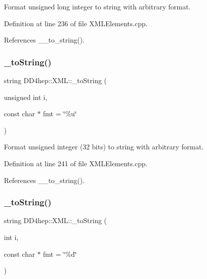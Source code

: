 Format unsigned long integer to string with arbitrary format. 



Definition at line 236 of file X\+M\+L\+Elements.\+cpp.



References \+\_\+\+\_\+to\+\_\+string().

\hypertarget{group___d_d4_h_e_p___x_m_l_ga394251d8f037bcee0db303753aefc97b}{}\label{group___d_d4_h_e_p___x_m_l_ga394251d8f037bcee0db303753aefc97b} 
\subsubsection{\texorpdfstring{\+\_\+to\+String()}{\_toString()}\hspace{0.1cm}{\footnotesize\ttfamily [6/12]}}
{\footnotesize\ttfamily string D\+D4hep\+::\+X\+M\+L\+::\+\_\+to\+String (\begin{DoxyParamCaption}\item[{unsigned int}]{i,  }\item[{const char $\ast$}]{fmt = {\ttfamily \char`\"{}\%u\char`\"{}} }\end{DoxyParamCaption})}



Format unsigned integer (32 bits) to string with arbitrary format. 



Definition at line 241 of file X\+M\+L\+Elements.\+cpp.



References \+\_\+\+\_\+to\+\_\+string().

\hypertarget{group___d_d4_h_e_p___x_m_l_ga3db5e3893d601405e4881f4e59aab45a}{}\label{group___d_d4_h_e_p___x_m_l_ga3db5e3893d601405e4881f4e59aab45a} 
\subsubsection{\texorpdfstring{\+\_\+to\+String()}{\_toString()}\hspace{0.1cm}{\footnotesize\ttfamily [7/12]}}
{\footnotesize\ttfamily string D\+D4hep\+::\+X\+M\+L\+::\+\_\+to\+String (\begin{DoxyParamCaption}\item[{int}]{i,  }\item[{const char $\ast$}]{fmt = {\ttfamily \char`\"{}\%d\char`\"{}} }\end{DoxyParamCaption})}



